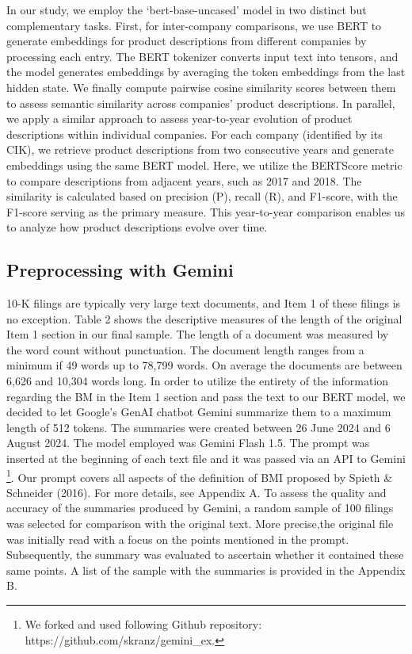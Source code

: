 \documentclass[
]{article}
\begin{document}
In our study, we employ the `bert-base-uncased' model in two distinct
but complementary tasks. First, for inter-company comparisons, we use
BERT to generate embeddings for product descriptions from different
companies by processing each entry. The BERT tokenizer converts input
text into tensors, and the model generates embeddings by averaging the
token embeddings from the last hidden state. We finally compute pairwise
cosine similarity scores between them to assess semantic similarity
across companies' product descriptions. In parallel, we apply a similar
approach to assess year-to-year evolution of product descriptions within
individual companies. For each company (identified by its CIK), we
retrieve product descriptions from two consecutive years and generate
embeddings using the same BERT model. Here, we utilize the BERTScore
metric to compare descriptions from adjacent years, such as 2017 and
2018. The similarity is calculated based on precision (P), recall (R),
and F1-score, with the F1-score serving as the primary measure. This
year-to-year comparison enables us to analyze how product descriptions
evolve over time.

\subsection{Preprocessing with Gemini}\label{preprocessing-with-gemini}

10-K filings are typically very large text documents, and Item 1 of
these filings is no exception. Table 2 shows the descriptive measures of
the length of the original Item 1 section in our final sample. The
length of a document was measured by the word count without punctuation.
The document length ranges from a minimum if 49 words up to 78,799
words. On average the documents are between 6,626 and 10,304 words long.
In order to utilize the entirety of the information regarding the BM in
the Item 1 section and pass the text to our BERT model, we decided to
let Google's GenAI chatbot Gemini summarize them to a maximum length of
512 tokens. The summaries were created between 26 June 2024 and 6 August
2024. The model employed was Gemini Flash 1.5. The prompt was inserted
at the beginning of each text file and it was passed via an API to
Gemini \footnote{We forked and used following Github repository:
  https://github.com/skranz/gemini\_ex.}. Our prompt covers all aspects
of the definition of BMI proposed by Spieth \& Schneider (2016). For
more details, see Appendix A. To assess the quality and accuracy of the
summaries produced by Gemini, a random sample of 100 filings was
selected for comparison with the original text. More precise,the
original file was initially read with a focus on the points mentioned in
the prompt. Subsequently, the summary was evaluated to ascertain whether
it contained these same points. A list of the sample with the summaries
is provided in the Appendix B.
\end{document}
